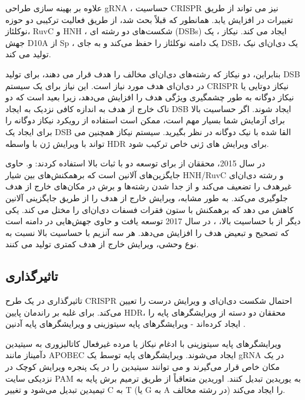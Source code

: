 \documentclass[12pt,a4paper,BCOR=.7cm,headsepline,bibliography=totoc]{report}
\begin{document}
علاوه بر بهینه سازی طراحی gRNA ، حساسیت CRISPR نیز می تواند از طریق تغییرات در  افزایش یابد. همانطور که قبلاً بحث شد،  از طریق فعالیت ترکیبی دو حوزه نوکلئاز، RuvC و HNH ، شکست‌های دو رشته ای (DSBs) ایجاد می کند. نیکاز  ، یک جهش D10A از Sp ، یک دامنه نوکلئاز را حفظ می‌کند و به جای  DSB، یک دی‌ان‌ای نیک تولید می کند.

بنابراین، دو نیکاز که رشته‌های دی‌ان‌ای مخالف را هدف قرار می دهند، برای تولید DSB در دی‌ان‌ای هدف مورد نیاز است. این نیاز برای یک سیستم CRISPR نیکاز دوتایی یا نیکاز دوگانه به طور چشمگیری ویژگی هدف را افزایش می‌دهد، زیرا بعید است که دو ناک خارج از هدف به اندازه کافی نزدیک به ایجاد DSB ایجاد شوند. اگر حساسیت بالا برای آزمایش شما بسیار مهم است، ممکن است استفاده از رویکرد نیکاز دوگانه را برای ایجاد یک DSB القا شده با نیک دوگانه در نظر بگیرید. سیستم نیکاز همچنین می تواند با ویرایش ژن با واسطه HDR برای ویرایش های ژنی خاص ترکیب شود.

در سال 2015، محققان از 
 برای توسعه دو  با ثبات بالا استفاده کردند:
 و.   
  حاوی جایگزین‌های آلانین است که برهمکنش‌های بین شیار HNH/RuvC و رشته دی‌ان‌ای غیرهدف را تضعیف می‌کند و از جدا شدن رشته‌ها و برش در مکان‌های خارج از هدف جلوگیری می‌کند. به طور مشابه،  ویرایش خارج از هدف را از طریق جایگزینی آلانین کاهش می دهد که برهمکنش  با ستون فقرات فسفات دی‌ان‌ای را مختل می کند. یکی دیگر از  با حساسیت بالا، ، در سال 2017 توسعه یافت و حاوی جهش‌هایی در دامنه  است که تصحیح  و تبعیض هدف را افزایش می‌دهد. 
هر سه آنزیم با حساسیت بالا نسبت به  نوع وحشی، ویرایش خارج از هدف کمتری تولید می کنند.

\subsection{تاثیرگذاری}
تاثیرگذاری در یک طرح CRISPR احتمال شکست دی‌ان‌ای و ویرایش درست را تعیین ‌می‌کند. برای غلبه بر راندمان پایین HDR، محققان دو دسته از ویرایشگرهای پایه را ایجاد کرده‌اند - ویرایشگرهای پایه سیتوزینی  و ویرایشگرهای پایه آدنین .

ویرایشگرهای پایه سیتوزینی با ادغام نیکاز  یا  مرده غیرفعال کاتالیزوری  به سیتیدین دآمیناز مانند APOBEC ایجاد می‌شوند. ویرایشگرهای پایه توسط یک gRNA در یک مکان خاص قرار می‌گیرند و می توانند سیتیدین را در یک پنجره ویرایش کوچک در نزدیکی سایت PAM به یوریدین تبدیل کنند. اوریدین متعاقباً از طریق ترمیم برش پایه به تیمیدین تبدیل می‌شود و تغییر C به T (یا G به A در رشته مخالف) را ایجاد می‌کند.
\end{document}
